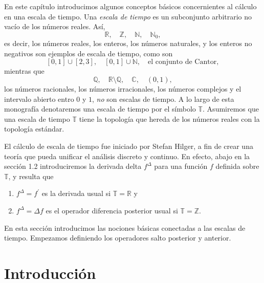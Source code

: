 En este capítulo introducimos algunos conceptos básicos concernientes al cálculo en una escala de tiempo. Una \emph{escala de tiempo} es un subconjunto arbitrario no vacío de los números reales. Así, \[ \mathds{R},\quad\mathds{Z},\quad\mathds{N},\quad\mathds{N}_{0}, \] es decir, los números reales, los enteros, los números naturales, y los enteros no negativos son ejemplos de escala de tiempo, como son \[ \left[0,1\right]\cup\left[2,3\right],\quad\left[0,1\right]\cup\mathds{N},\quad\text{el conjunto de Cantor}, \] mientras que \[ \mathds{Q},\quad\mathds{R}\setminus\mathds{Q},\quad\mathds{C},\quad\left(0,1\right), \] los números racionales, los números irracionales, los números complejos y el intervalo abierto entro $0$ y $1$, \emph{no} son escalas de tiempo. A lo largo de esta monografía denotaremos una escala de tiempo por el símbolo $\mathds{T}$. Asumiremos que una escala de tiempo $\mathds{T}$ tiene la topología que hereda de los números reales con la topología estándar.

El cálculo de escala de tiempo fue iniciado por Stefan Hilger, a fin de crear una teoría que pueda unificar el análisis discreto y continuo. En efecto, abajo en la sección 1.2 introduciremos la derivada delta $f^{\Delta}$ para una función $f$ definida sobre $\mathds{T}$, y resulta que
\begin{enumerate}
	\item $f^{\Delta}=f^{\prime}$ es la derivada usual si $\mathds{T}=\mathds{R}$ y
	\item $f^{\Delta}=\Delta f$ es el operador diferencia posterior usual si $\mathds{T}=\mathds{Z}$.
\end{enumerate}
En esta sección introducimos las nociones básicas conectadas a las escalas de tiempo. Empezamos definiendo los operadores salto posterior y anterior.

\section{Introducción}

